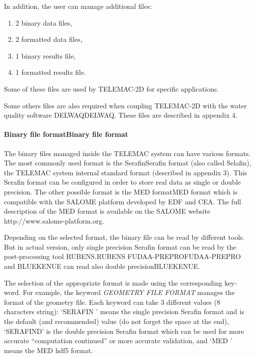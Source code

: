 \documentclass{article} %
\begin{document}
 In addition, the user can manage additional files:

\begin{enumerate}
\item  2 binary data files,

\item  2 formatted data files,

\item  1 binary results file,

\item  1 formatted results file.
\end{enumerate}

 Some of these files are used by TELEMAC-2D for specific applications.

 Some others files are also required when coupling TELEMAC-2D with the water quality software DELWAQDELWAQ. These files are described in appendix 4.


\paragraph{ Binary file formatBinary file format}

 The binary files managed inside the TELEMAC system can have various formats. The most commonly used format is the SerafinSerafin format (also called Selafin), the TELEMAC system internal standard format (described in appendix 3). This Serafin format can be configured in order to store real data as single or double precision. The other possible format is the MED formatMED format which is compatible with the SALOME platform developed by EDF and CEA. The full description of the MED format is available on the SALOME website http://www.salome-platform.org.

 Depending on the selected format, the binary file can be read by different tools. But in actual version, only single precision Serafin format can be read by the post-processing tool RUBENS.RUBENS FUDAA-PREPROFUDAA-PREPRO and BLUEKENUE can read also double precisionBLUEKENUE.

 The selection of the appropriate format is made using the corresponding key-word. For example, the keyword \textit{GEOMETRY FILE FORMAT }manages the format of the geometry file. Each keyword can take 3 different values (8 characters string): `SERAFIN ' means the single precision Serafin format and is the default (and recommended) value (do not forget the space at the end), `SERAFIND' is the double precision Serafin format which can be used for more accurate ``computation continued'' or more accurate validation, and `MED     ' means the MED hdf5 format.
\end{document}

